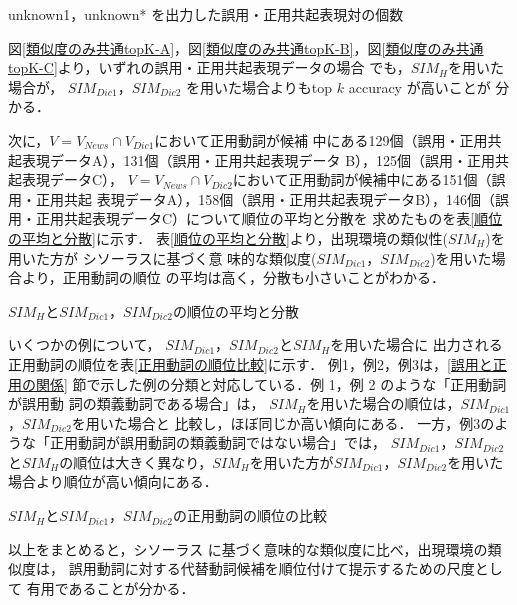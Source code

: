 \documentclass[japanese]{jnlp_1.4}
\begin{document}
\begin{table}[t]
\caption{unknown1，unknown* を出力した誤用・正用共起表現対の個数}
\label{unknownの個数}

\end{table}

図\ref{類似度のみ共通topK-A}，図\ref{類似度のみ共通topK-B}，図\ref{類似度のみ共通topK-C}より，いずれの誤用・正用共起表現データの場合
でも，$SIM_{H}$を用いた場合が，
$SIM_{Dic1}$，$SIM_{Dic2}$ を用いた場合よりもtop $k$ accuracy が高いことが
分かる．

次に，$V=V_{News}\cap V_{Dic1}$において正用動詞が候補
中にある129個（誤用・正用共起表現データA），131個（誤用・正用共起表現データ
B），125個（誤用・正用共起表現データC），
$V=V_{News}\cap V_{Dic2}$において正用動詞が候補中にある151個（誤用・正用共起
表現データA），158個（誤用・正用共起表現データB），146個（誤用・正用共起表現データC）について順位の平均と分散を
求めたものを表\ref{順位の平均と分散}に示す．
表\ref{順位の平均と分散}より，出現環境の類似性($SIM_{H}$)を用いた方が
シソーラスに基づく意
味的な類似度($SIM_{Dic1}$，$SIM_{Dic2}$)を用いた場合より，正用動詞の順位
の平均は高く，分散も小さいことがわかる．

\begin{table}[t]
\caption{$SIM_{H}$と$SIM_{Dic1}$，$SIM_{Dic2}$の順位の平均と分散}
\label{順位の平均と分散}

\end{table}

いくつかの例について，
$SIM_{Dic1}$，$SIM_{Dic2}$と$SIM_{H}$を用いた場合に
出力される正用動詞の順位を表\ref{正用動詞の順位比較}に示す．
例1，例2，例3は，\ref{誤用と正用の関係}
節で示した例の分類と対応している．例 1，例 2 のような「正用動詞が誤用動
詞の類義動詞である場合」は，
$SIM_{H}$を用いた場合の順位は，$SIM_{Dic1}$，$SIM_{Dic2}$を用いた場合と
比較し，ほぼ同じか高い傾向にある．
一方，例3のような「正用動詞が誤用動詞の類義動詞ではない場合」では，
$SIM_{Dic1}$，$SIM_{Dic2}$と$SIM_{H}$の順位は大きく異なり，$SIM_{H}$を用いた方が$SIM_{Dic1}$，$SIM_{Dic2}$を用いた場合より順位が高い傾向にある．

\begin{table}[t]
\caption{$SIM_{H}$と$SIM_{Dic1}$，$SIM_{Dic2}$の正用動詞の順位の比較}
\label{正用動詞の順位比較}

\end{table}

以上をまとめると，シソーラス
に基づく意味的な類似度に比べ，出現環境の類似度は，
誤用動詞に対する代替動詞候補を順位付けて提示するための尺度として
有用であることが分かる．
\end{document}
